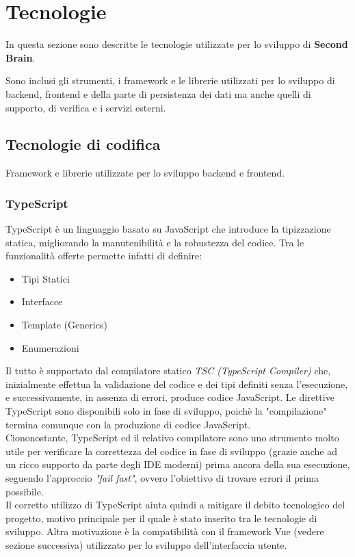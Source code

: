 \documentclass[a4paper,10pt]{article}
\begin{document}
\newpage

\section{Tecnologie}
In questa sezione sono descritte le tecnologie utilizzate per lo sviluppo di \textbf{Second Brain}.

Sono inclusi gli strumenti, i framework e le librerie utilizzati per lo sviluppo di backend, frontend e della parte di persistenza dei dati ma anche quelli di supporto, di verifica e i servizi esterni.
\subsection{Tecnologie di codifica}
Framework e librerie utilizzate per lo sviluppo backend e frontend.

\subsubsection{TypeScript}
TypeScript è un linguaggio basato su JavaScript che introduce la tipizzazione statica, migliorando la manutenibilità e la robustezza del codice. Tra le funzionalità offerte permette infatti di definire:
\begin{itemize}
    \item Tipi Statici
    \item Interfacce 
    \item Template (Generics)
    \item Enumerazioni
\end{itemize}
Il tutto è supportato dal compilatore statico \textit{TSC (TypeScript Compiler)} che, inizialmente effettua la validazione del codice e dei tipi definiti senza l'esecuzione, e successivamente, in assenza di errori, produce codice JavaScript.
Le direttive TypeScript sono disponibili solo in fase di sviluppo, poichè la "compilazione" termina comunque con la produzione di codice JavaScript. \\

Ciononostante, TypeScript ed il relativo compilatore sono uno strumento molto utile per verificare la correttezza del codice in fase di sviluppo (grazie anche ad un ricco supporto da parte degli IDE moderni) prima ancora della sua esecuzione, seguendo l'approccio \textit{"fail fast"}, ovvero l'obiettivo di trovare errori il prima possibile. \\

Il corretto utilizzo di TypeScript aiuta quindi a mitigare il debito tecnologico del progetto, motivo principale per il quale è stato inserito tra le tecnologie di sviluppo. Altra motivazione è la compatibilità con il framework Vue (vedere sezione successiva) utilizzato per lo sviluppo dell'interfaccia utente.
\end{document}
